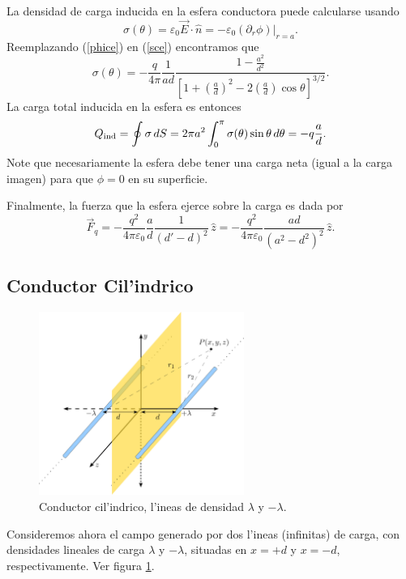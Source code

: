 La densidad de carga inducida en la esfera conductora puede calcularse usando
\begin{equation}\label{sce}
 \sigma(\theta)=\varepsilon_0\vec{E}\cdot\hat{n}
=-\varepsilon_0\left.(\partial_r\phi)\right|_{r=a}.
\end{equation}
Reemplazando (\ref{phice}) en (\ref{sce}) encontramos que
\begin{equation}
 \sigma(\theta)=-\frac{q}{4\pi}\frac{1}{ad}\frac{1-\frac{a^2}{d^2
}}{\left[1+\left(\frac{a}{d}\right)^2-2\left(\frac{a}{d}\right)\cos\theta\right]
^{3/2}}.
\end{equation}
La carga total inducida en la esfera es entonces
\begin{equation}
 Q_{\rm ind}=\oint\sigma\,dS=2\pi
a^2\int_0^\pi\sigma(\theta)\sin\theta\,d\theta=-q\frac{a}{d}.
\end{equation}
Note que necesariamente la esfera debe tener una carga neta (igual a la carga imagen) para que $\phi=0$ en su superficie.

Finalmente, la fuerza que la esfera ejerce sobre la carga es dada por
\begin{equation}
\vec{F}_q=-\frac{q^2}{4\pi\varepsilon_0}\frac{a}{d}\frac{1}{(d'-d)^2}\,
\hat{z}=-\frac { q^2 }{4\pi\varepsilon_0}\frac{ad}{(a^2-d^2)^2}\,\hat{z}.
\end{equation}

\subsection{Conductor Cil'indrico}
\begin{figure}[!h]
\centerline{\includegraphics[height=6cm]{fig/fig-metodo-imagenes-cilindros-01.pdf}}
\caption{Conductor cil'indrico, l'ineas de densidad $\lambda$ y $-\lambda$.}
\label{ci03}
\end{figure}
Consideremos ahora el campo generado por dos l'ineas (infinitas) de carga, con
densidades lineales de carga $\lambda$ y $-\lambda$, situadas en $x=+d$ y
$x=-d$, respectivamente. Ver figura \ref{ci03}.

